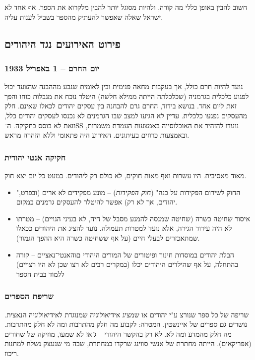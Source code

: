\documentclass[a4paper]{book}
\begin{document}
	חשוב להבין באופן כללי מה קורה, ולהיות מסוגל יותר להבין מלקרוא את הספר. אף אחד לא ישראל שאלה שאפשר להעתיק מהספר בשביל לענות עליה. 
	
	\subsection{פירוט האירועים נגד היהודים}
	\subsubsection{יום החרם – 1 באפריל 1933}
	נועד להיות חרם כולל, אך בעקבות מחאה פנימית ובין לאומית שנבע מההבנה שהצעד יכול לפגוע כלכלית בגרמניה (שכלכלתה הייתה ממילא חלשה) היטלר נוכח את מגבלות כוחו והפך זאת ליום אחד. בנושא בידוד, החרם גרם להבחנה בין עסקים יהודים לכאלו שאינם. חלק מהעסקים נפגעו כלכלית. עדיין לא הגיעו למצב שבו הגרמנים לא נכנסו לעסקים יהודים כלל, וזאת לא בוסס בחקיקה. ה־SS נועדו להזהיר את האוכלוסייה באמצעות העמדת משמרות, ובאמצעות כרוזים בעיתונים. האירוע היה פתאומי וללא הזהרה מראש. 
	\subsubsection{חקיקה אנטי יהודית}
	מאוד מאסיבית. היו עשרות ואף מאות חוקים, לא כולם רק ליהודים. כמעט כל יום יצא חוק. 
	\begin{itemize}
		\item "החוק לשירום הפקידות על כנה" (\textit{חוק הפקידות}) – מונע מפקידים לא ארים (ובפרט, יהודים, אך לא רק) אפשר להיטלר להעסקים גרמנים במקום. 
		\item איסור שחיטה כשרה (שחיטה שמנסה להמנע מסבל של חיה, לא בעיני הגויים) – מטרתו לא היה עידוד הגירה, אלא נועד למטרות תעמולה. נועד להציג את היהודים ככאלו שמתאכזרים לבעלי חיים (על אף ששחיטה כשרה היא ההפך הגמור). 
		\item הבלת יהודים במוסדות חינוך ופיטורים של המורים היהודי םוהאנטי־נאציים – קורה בהתחלה, על אף שהילדים היהודים יכלו (במקרים רבים לא רצו שכן לא היו רצויים) ללמוד בבית הספר
	\end{itemize}
	
	\subsubsection{שריפת הספרים}
	שריפה של כל ספר שנורצ ע"י יהודים או שמציג אידיאולוגיה שמנוגדת לאידיאולוגיה הנאצית. נושרים גם ספרים של איינשטין. המטרה: לקבוע מה חלק מהתרבות ומה לא חלק מהתרבות. מה חלק מהמדע ומה לא. לא רק בהקשר היהודי – ג'אז לא שמעו, מוזיקה של שחורים (אפריקאים). הייתה מחתרת של אנשי סווינג שרקדו במחתרת, שבה מי שנעצק נשלח למחנות ריכוז. 
\end{document}
